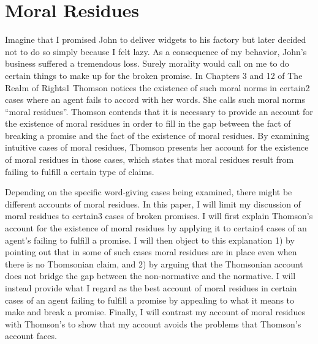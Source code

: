 \chapter*{Moral Residues}
Imagine that I promised John to deliver widgets to his factory but later decided not to do so simply because I felt lazy. As a consequence of my behavior, John’s business suffered a tremendous loss. Surely morality would call on me to do certain things to make up for the broken promise. In Chapters 3 and 12 of The Realm of Rights1 Thomson notices the existence of such moral norms in certain2 cases where an agent fails to accord with her words. She calls such moral norms ``moral residues''. Thomson contends that it is necessary to provide an account for the existence of moral residues in order to fill in the gap between the fact of breaking a promise and the fact of the existence of moral residues. By examining intuitive cases of moral residues, Thomson presents her account for the existence of moral residues in those cases, which states that moral residues result from failing to fulfill a certain type of claims.

Depending on the specific word-giving cases being examined, there might be different accounts of moral residues. In this paper, I will limit my discussion of moral residues to certain3 cases of broken promises. I will first explain Thomson’s account for the existence of moral residues by applying it to certain4 cases of an agent’s failing to fulfill a promise. I will then object to this explanation 1) by pointing out that in some of such cases moral residues are in place even when there is no Thomsonian claim, and 2) by arguing that the Thomsonian account does not bridge the gap between the non-normative and the normative. I will instead provide what I regard as the best account of moral residues in certain cases of an agent failing to fulfill a promise by appealing to what it means to make and break a promise. Finally, I will contrast my account of moral residues with Thomson’s to show that my account avoids the problems that Thomson’s account faces.